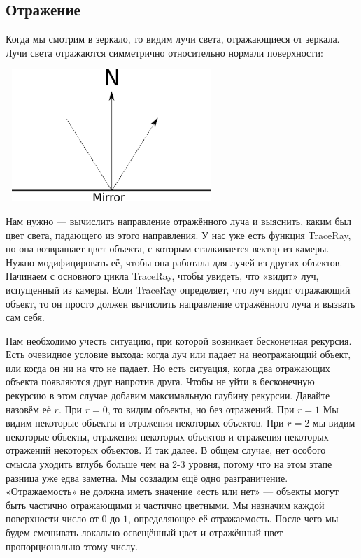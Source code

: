 \subsection{Отражение}
Когда мы смотрим в зеркало, то видим лучи света, отражающиеся от зеркала. Лучи света отражаются симметрично относительно нормали поверхности:

\includegraphics[width=8cm, height=5cm]{reflection.png}

Нам нужно — вычислить направление отражённого луча и выяснить, каким был цвет света, падающего из этого направления.
У нас уже есть функция TraceRay, но она возвращает цвет объекта, с которым сталкивается вектор из камеры.
Нужно модифицировать её, чтобы она работала для лучей из других объектов.
Начинаем с основного цикла TraceRay, чтобы увидеть, что «видит» луч, испущенный из камеры. Если TraceRay определяет, что луч видит отражающий объект, то он просто должен вычислить направление отражённого луча и вызвать сам себя.

Нам необходимо учесть ситуацию, при которой возникает бесконечная рекурсия.
Есть очевидное условие выхода: когда луч или падает на неотражающий объект, или когда он ни на что не падает. Но есть ситуация, когда два отражающих объекта появляются друг напротив друга. Чтобы не уйти в бесконечную рекурсию в этом случае добавим максимальную глубину рекурсии.
Давайте назовём её $r$. При $r = 0$, то видим объекты, но без отражений. При $r = 1$ Мы видим некоторые объекты и отражения некоторых объектов. При $r = 2$ мы видим некоторые объекты, отражения некоторых объектов и отражения некоторых отражений некоторых объектов. И так далее. В общем случае, нет особого смысла уходить вглубь больше чем на 2-3 уровня, потому что на этом этапе разница уже едва заметна.
Мы создадим ещё одно разграничение. «Отражаемость» не должна иметь значение «есть или нет» — объекты могут быть частично отражающими и частично цветными. Мы назначим каждой поверхности число от $0$ до $1$, определяющее её отражаемость. После чего мы будем смешивать локально освещённый цвет и отражённый цвет пропорционально этому числу.

